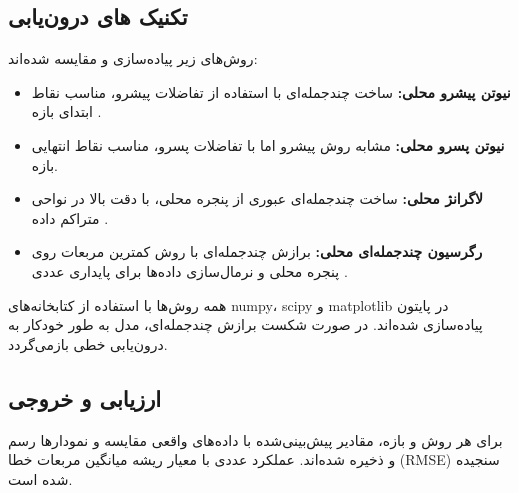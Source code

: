 \subsection{تکنیک های درون‌یابی}

روش‌های زیر پیاده‌سازی و مقایسه شده‌اند:
\begin{itemize}
    \item \textbf{نیوتن پیشرو محلی:} ساخت چندجمله‌ای با استفاده از تفاضلات پیشرو، مناسب نقاط ابتدای بازه \cite{atkinson1989introduction, burden2011numerical}.
    \item \textbf{نیوتن پسرو محلی:} مشابه روش پیشرو اما با تفاضلات پسرو، مناسب نقاط انتهایی بازه.
    \item \textbf{لاگرانژ محلی:} ساخت چندجمله‌ای عبوری از پنجره محلی، با دقت بالا در نواحی متراکم داده \cite{atkinson1989introduction}.
    \item \textbf{رگرسیون چندجمله‌ای محلی:} برازش چندجمله‌ای با روش کمترین مربعات روی پنجره محلی و نرمال‌سازی داده‌ها برای پایداری عددی \cite{brown2021polynomial}.
\end{itemize}

همه روش‌ها با استفاده از کتابخانه‌های numpy، scipy و matplotlib در پایتون پیاده‌سازی شده‌اند. در صورت شکست برازش چندجمله‌ای، مدل به طور خودکار به درون‌یابی خطی بازمی‌گردد.

\subsection{ارزیابی و خروجی}

برای هر روش و بازه، مقادیر پیش‌بینی‌شده با داده‌های واقعی مقایسه و نمودارها رسم و ذخیره شده‌اند. عملکرد عددی با معیار ریشه میانگین مربعات خطا (RMSE) سنجیده شده است.

